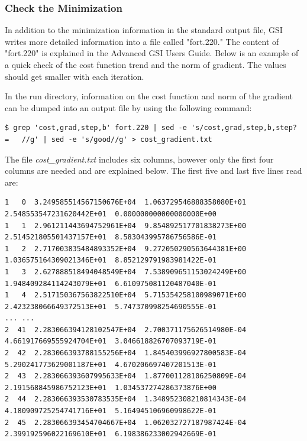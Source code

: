 \subsubsection{Check the Minimization}
\label{sec5.1.4.2}

In addition to the minimization information in the standard output file, GSI writes more detailed information into a file called "fort.220."  The content of "fort.220" is explained in the Advanced GSI User\textquotesingle s Guide.  Below is an example of a quick check of the cost function trend and the norm of gradient.  The values should get smaller with each iteration.

In the run directory, information on the cost function and norm of the gradient can be dumped into an output file by using the following command:

\begin{scriptsize}
\begin{verbatim}
$ grep 'cost,grad,step,b' fort.220 | sed -e 's/cost,grad,step,b,step? =   //g' | sed -e 's/good//g' > cost_gradient.txt
\end{verbatim}
\end{scriptsize}

The file \textit{cost\_gradient.txt} includes six columns, however only the first four columns are needed and are explained below.  The first five and last five lines read are:

\begin{scriptsize}
\begin{verbatim}
1   0  3.249585514567150676E+04  1.063729546888358080E+01  2.548553547231620442E+01  0.000000000000000000E+00   
1   1  2.961211443694752961E+04  9.854892517701838273E+00  2.514521805501437157E+01  8.583043995786756586E-01   
1   2  2.717003835484893352E+04  9.272050290563644381E+00  1.036575164309021346E+01  8.852129791983981422E-01   
1   3  2.627888518494048549E+04  7.538909651153024249E+00  1.948409284114243079E+01  6.610975081120487040E-01   
1   4  2.517150367563822510E+04  5.715354258100989071E+00  2.423238066649372513E+01  5.747370998254690555E-01     
... ...
2  41  2.283066394128102547E+04  2.700371175626514980E-04  4.661917669555924704E+01  3.046618826707093719E-01   
2  42  2.283066393788155256E+04  1.845403996927800583E-04  5.290241773629001187E+01  4.670206697407201513E-01   
2  43  2.283066393607995633E+04  1.877001128106250809E-04  2.191568845986752123E+01  1.034537274286373876E+00   
2  44  2.283066393530783535E+04  1.348952308210814343E-04  4.180909725254741716E+01  5.164945106960998622E-01   
2  45  2.283066393454704667E+04  1.062032727187987424E-04  2.399192596022169610E+01  6.198386233002942669E-01   

\end{verbatim}
\end{scriptsize}


